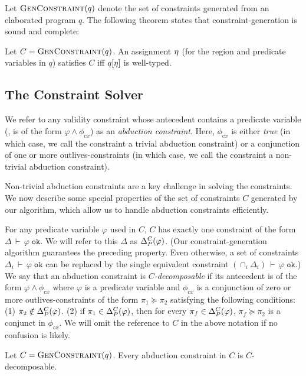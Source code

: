\documentclass[a4paper,UKenglish]{lipics-v2018}
\newcommand{\conj}{\wedge}
\newcommand{\tywf}[2]{#1\,\vdash\,#2 \; \texttt{ok}}
\newcommand{\outlives}{\succeq}
\newcommand{\phictxt}{\phi_{cx}}
\begin{document}
Let $\textsc{GenConstraint}(q)$ denote the set of constraints generated from an
elaborated program $q$.  The following theorem states that
constraint-generation is sound and complete:
\begin{theorem}
\label{thm:constraint-generation-sc}
  Let $C = \textsc{GenConstraint}(q)$.  An assignment $\eta$ (for the region and
  predicate variables in $q$) satisfies $C$ iff $q[\eta]$ is
  well-typed.
\end{theorem}

\subsection{The Constraint Solver}

We refer to any validity constraint whose antecedent contains a
predicate variable (\ie, is of the form $\varphi \conj \phictxt$) as
an \emph{abduction constraint}.  Here,  $\phictxt$ is either
\emph{true} (in which case, we call the constraint a trivial abduction
constraint) or a conjunction of one or more outlives-constraints (in
which case, we call the constraint a non-trivial abduction
constraint).

Non-trivial abduction constraints are a key challenge in solving the
constraints.  We now describe some special properties of the set of
constraints $C$ generated by our algorithm, which allow us to handle
abduction constraints efficiently.

For any predicate variable $\varphi$ used in $C$, $C$ has exactly one
constraint of the form $\tywf{\Delta}{\varphi}$. We will refer to this
$\Delta$ as $\Delta_P^C(\varphi)$.  (Our constraint-generation algorithm
guarantees the preceding property.  Even otherwise, a set of
constraints $\tywf{\Delta_i}{\varphi}$ can be replaced by the single
equivalent constraint $\tywf{(\cap_i \Delta_i)}{\varphi}$.) We say
that an abduction constraint is \emph{$C$-decomposable} if its
antecedent is of the form $\varphi \conj \phictxt$ where $\varphi$ is
a predicate variable and $\phictxt$ is a conjunction of zero or more
outlives-constraints of the form $\pi_1 \outlives \pi_2$ satisfying
the following conditions: (1) $\pi_2 \notin \Delta_P^C(\varphi)$.  (2)
if $\pi_1 \in \Delta_P^C(\varphi)$, then for every $\pi_f \in
\Delta_P^C(\varphi)$, $\pi_f \outlives \pi_2$ is a conjunct in
$\phictxt$.  We will omit the reference to $C$ in the above notation
if no confusion is likely.

\begin{lemma}
  \label{lemma:gc-is-decomposable}
  Let $C = \textsc{GenConstraint}(q)$. Every abduction constraint in $C$ is $C$-decomposable.
\end{lemma}
\end{document}
